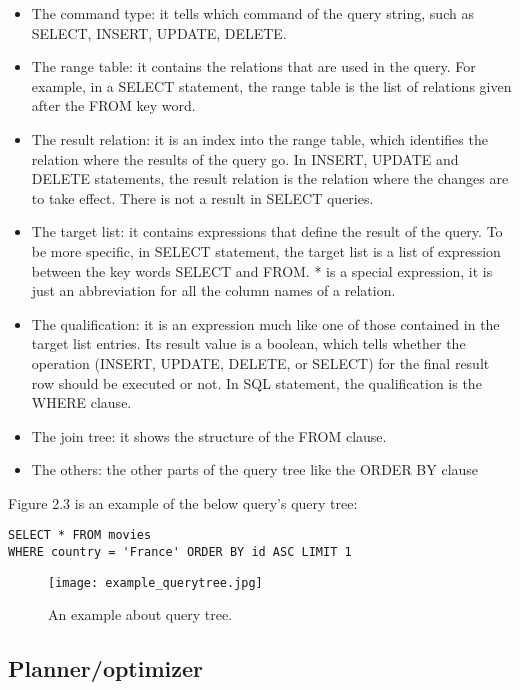 \begin{itemize}
    \item The command type: it tells which command of the query string, such as
    	SELECT, INSERT, UPDATE, DELETE.
    \item The range table: it contains the relations that are used in the query.
    	For example, in a SELECT statement, the range table is the list of relations given after 
    	the FROM key word.
    \item The result relation: it is an index into the range table, which identifies
    	the relation where the results of the query go. In INSERT, UPDATE and DELETE statements,
    	the result relation is the relation where the changes are to take effect. There is not 
    	a result in SELECT queries.
    \item The target list: it contains expressions that define the result of the query. To
     	be more specific, in SELECT statement, the target list is a list of expression 	
     	between the key words SELECT and FROM. * is a special expression, it is just an 
     	abbreviation for all the column names of a relation.
    \item The qualification: it is an expression much like one of those contained in the target list 
    	entries. Its result value is a boolean, which tells whether the operation (INSERT, UPDATE, 
    	DELETE, or SELECT) for the final result row should be executed or not. In SQL statement, the qualification
    	is the WHERE clause.
    \item The join tree: it shows the structure of the FROM clause. 
    \item The others: the other parts of the query tree like the ORDER BY clause
\end{itemize}

Figure 2.3 is an example of the below query's query tree:
\begin{verbatim}
SELECT * FROM movies
WHERE country = 'France' ORDER BY id ASC LIMIT 1
\end{verbatim}

\begin{figure}[H]
    \centering
    \texttt{[image: example\_querytree.jpg]}
    \caption{An example about query tree.}
\end{figure}

\subsection{Planner/optimizer}

